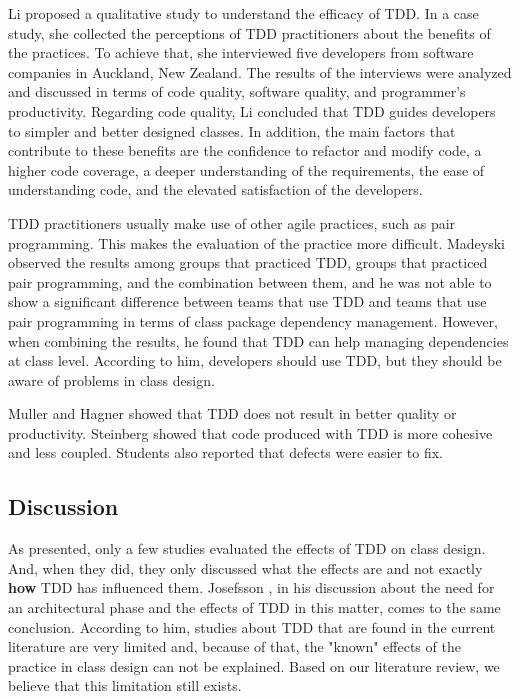 \documentclass[times]{speauth}
\begin{document}
Li \cite{angela-li} proposed a qualitative study to understand the efficacy of TDD.
In a case study, she collected the perceptions of TDD practitioners about the
benefits of the practices. To achieve that, she interviewed five developers
from software companies in Auckland, New Zealand. The results of the interviews
were analyzed and discussed in terms of code quality, software quality, and
programmer's productivity. Regarding code quality, Li concluded that TDD
guides developers to simpler and better designed classes. In addition, the main
factors that contribute to these benefits are the confidence to refactor and
modify code, a higher code coverage, a deeper understanding of the requirements,
the ease of understanding code, and the elevated
satisfaction of the developers.

TDD practitioners usually make use of other agile practices, such as
pair programming. This makes the evaluation of the practice more difficult.
Madeyski \cite{madeyski-package-dependencies} observed the results
among groups that practiced TDD, groups that practiced pair programming,
and the combination between them, and he was not able to show a significant
difference between teams that use TDD and teams that use pair programming
in terms of class package dependency management. However, when combining
the results, he found that TDD can help managing dependencies at class level.
According to him, developers should use TDD, but they should be aware of 
problems in class design.

Muller and Hagner \cite{muller-e-hagner} showed that TDD does not result in
better quality or productivity. Steinberg \cite{steinberg} showed that
code produced with TDD is more cohesive and less coupled. Students also reported
that defects were easier to fix.

\subsection{Discussion}

As presented, only a few studies evaluated the effects of TDD on class design.
And, when they did, they only discussed what the effects are and not exactly
\textbf{how} TDD has influenced them. Josefsson \cite{josefsson}, in his discussion
about the need for an architectural phase and the effects of TDD in this matter,
comes to the same conclusion. According to him, studies about TDD that are
found in the current literature are very limited and, because of that, the
"known" effects of the practice in class design can not be explained. Based on
our literature review, we believe that this limitation still exists.
\end{document}
